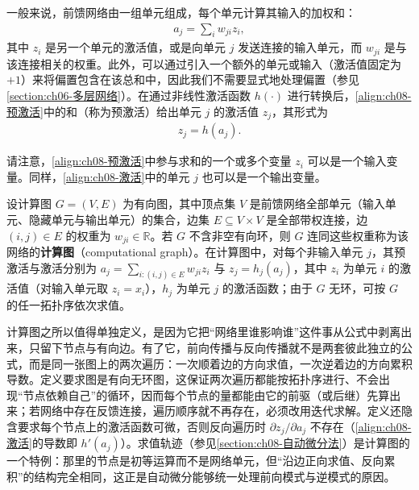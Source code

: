 \documentclass[../../main.tex]{subfiles}
\begin{document}
一般来说，前馈网络由一组单元组成，每个单元计算其输入的加权和：
\begin{align}
a_j=\sum_{i}w_{ji}z_i,
\label{align:ch08-预激活}
\end{align}
其中 $z_i$ 是另一个单元的激活值，或是向单元 $j$ 发送连接的输入单元，而 $w_{ji}$ 是与该连接相关的权重。此外，可以通过引入一个额外的单元或输入（激活值固定为 $+1$）来将偏置包含在该总和中，因此我们不需要显式地处理偏置（参见\cref{section:ch06-多层网络}）。在通过非线性激活函数 $h(\cdot)$ 进行转换后，\eqref{align:ch08-预激活}中的和（称为预激活）给出单元 $j$ 的激活值 $z_j$，其形式为
\begin{align}
z_j=h(a_j).
\label{align:ch08-激活}
\end{align}

请注意，\eqref{align:ch08-预激活}中参与求和的一个或多个变量 $z_i$ 可以是一个输入变量。同样，\eqref{align:ch08-激活}中的单元 $j$ 也可以是一个输出变量。

\begin{definition}[计算图]\label{definition:ch08-计算图}
设计算图 $G=(V,E)$ 为有向图，其中顶点集 $V$ 是前馈网络全部单元（输入单元、隐藏单元与输出单元）的集合，边集 $E\subseteq V\times V$ 是全部带权连接，边 $(i,j)\in E$ 的权重为 $w_{ji}\in\mathbb{R}$。若 $G$ 不含非空有向环，则 $G$ 连同这些权重称为该网络的\textbf{计算图}（computational graph）。在计算图中，对每个非输入单元 $j$，其预激活与激活分别为 $a_j=\sum_{i:(i,j)\in E}w_{ji}z_i$ 与 $z_j=h_j(a_j)$，其中 $z_i$ 为单元 $i$ 的激活值（对输入单元取 $z_i=x_i$），$h_j$ 为单元 $j$ 的激活函数；由于 $G$ 无环，可按 $G$ 的任一拓扑序依次求值。
\end{definition}

\begin{remark}
计算图之所以值得单独定义，是因为它把“网络里谁影响谁”这件事从公式中剥离出来，只留下节点与有向边。有了它，前向传播与反向传播就不是两套彼此独立的公式，而是同一张图上的两次遍历：一次顺着边的方向求值，一次逆着边的方向累积导数。定义要求图是有向无环图，这保证两次遍历都能按拓扑序进行、不会出现“节点依赖自己”的循环，因而每个节点的量都能由它的前驱（或后继）先算出来；若网络中存在反馈连接，遍历顺序就不再存在，必须改用迭代求解。定义还隐含要求每个节点上的激活函数可微，否则反向遍历时 $\partial z_j/\partial a_j$ 不存在（\eqref{align:ch08-激活}的导数即 $h'(a_j)$）。求值轨迹（参见\cref{section:ch08-自动微分法}）是计算图的一个特例：那里的节点是初等运算而不是网络单元，但“沿边正向求值、反向累积”的结构完全相同，这正是自动微分能够统一处理前向模式与逆模式的原因。
\end{remark}
\end{document}
